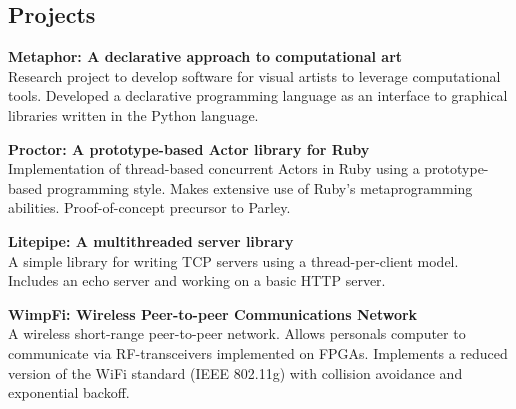 \documentclass[margin,line]{resume}
\begin{document}
\begin{resume}
    \section{\mysidestyle Projects}
    {\bf Metaphor: A declarative approach to computational art}\\
    Research project to develop software for visual artists to leverage
    computational tools. Developed a declarative programming language as an
    interface to graphical libraries written in the Python language.

    {\bf Proctor: A prototype-based Actor library for Ruby} \\
    Implementation of thread-based concurrent Actors in Ruby using a
    prototype-based programming style. Makes extensive use of Ruby's
    metaprogramming abilities. Proof-of-concept precursor to Parley.

    {\bf Litepipe: A multithreaded server library} \\
    A simple library for writing TCP servers using a thread-per-client
    model. Includes an echo server and working on a basic HTTP server.

    {\bf WimpFi: Wireless Peer-to-peer Communications Network}\\
    A wireless short-range peer-to-peer network. Allows personals computer to
    communicate via RF-transceivers implemented on FPGAs. Implements a reduced
    version of the WiFi standard (IEEE 802.11g) with collision avoidance and
    exponential backoff.
    

\end{resume}
\end{document}
